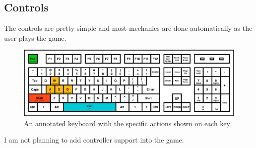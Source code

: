 \documentclass[12pt]{article}
\begin{document}
	\subsection{Controls}
	The controls are pretty simple and most mechanics are done automatically as the user plays the game.
	
	\begin{figure}[h]
		\includegraphics[scale=0.2]{keyboardLayout}
		\centering
		\caption{An annotated keyboard with the specific actions shown on each key}
	\end{figure}
	
	I am not planning to add controller support into the game.
	\pagebreak
	{\setlength{\parskip}{0pt}%
	
	}
	
\end{document}
